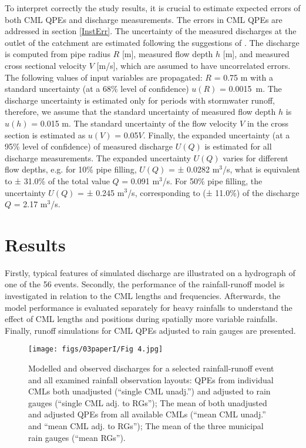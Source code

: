 \documentclass{ctuthesis}\usepackage[]{graphicx}\usepackage[]{color}
\begin{document}
To interpret correctly the study results, it is crucial to estimate expected errors of both CML QPEs and discharge measurements. The errors in CML QPEs are addressed in section \ref{InstErr}. The uncertainty of the measured discharges at the outlet of the catchment are estimated following the suggestions of \cite{musteStandardizedUncertaintyAnalysis2012}. The discharge is computed from pipe radius $R$ [m], measured flow depth $h$ [m], and measured cross sectional velocity $V$ [m/s], which are assumed to have uncorrelated errors. The following values of input variables are propagated: $R$ = 0.75 m with a standard uncertainty (at a 68\% level of confidence) $u(R)$ = 0.0015~m. The discharge uncertainty is estimated only for periods with stormwater runoff, therefore, we assume that the standard uncertainty of measured flow depth $h$ is $u(h)$ = 0.015 m. The standard uncertainty of the flow velocity $V$ in the cross section is estimated as $u(V)$ = 0.05$V$. Finally, the expanded uncertainty (at a 95\% level of confidence) of measured discharge $U(Q)$ is estimated for all discharge measurements. The expanded uncertainty $U(Q)$ varies for different flow depths, e.g. for 10\% pipe filling, $U(Q)$ = ± 0.0282 m$^3$/s, what is equivalent to ± 31.0\% of the total value $Q$ = 0.091 m$^3$/s. For 50\% pipe filling, the uncertainty $U(Q)$ = ± 0.245 m$^3$/s, corresponding to (± 11.0\%) of the discharge $Q$ = 2.17 m$^3$/s.



\section{Results}

Firstly, typical features of simulated discharge are illustrated on a hydrograph of one of the 56 events. Secondly, the performance of the rainfall-runoff model is investigated in relation to the CML lengths and frequencies. Afterwards, the model performance is evaluated separately for heavy rainfalls to understand the effect of CML lengths and positions during spatially more variable rainfalls. Finally, runoff simulations for CML QPEs adjusted to rain gauges are presented.


\begin{figure}[H]
\begin{center}
\texttt{[image: figs/03paperI/Fig 4.jpg]}
\caption{Modelled and observed discharges for a selected rainfall-runoff event and all examined rainfall observation layouts: QPEs from individual CMLs both unadjusted (“single CML unadj.”) and adjusted to rain gauges (“single CML adj. to RGs”); The mean of both unadjusted and adjusted QPEs from all available CMLs (“mean CML unadj.” and “mean CML adj. to RGs”); The mean of the three municipal rain gauges (“mean RGs”).} \label{3fig4}
\end{center}
\end{figure}
\end{document}
